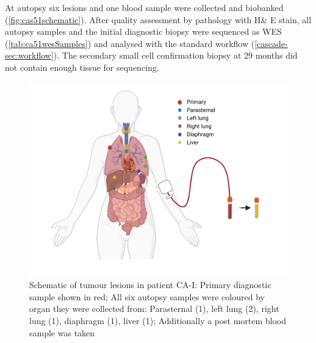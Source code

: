 At autopsy six lesions and one blood sample were collected and biobanked (\autoref{fig:cas51schematic}). After quality assessment by pathology with H\& E stain, all autopsy samples and the initial diagnostic biopsy were sequenced as WES (\autoref{tab:ca51wesSamples}) and analysed with the standard workflow (\autoref{cascade-sec:workflow}). The secondary small cell confirmation biopsy at 29 months did not contain enough tissue for sequencing.

\begin{figure}[ht]
	\centering
	\includegraphics[width=.99\linewidth]{Figures/CASCADE/CA51/CA-I_schematic_CA51_organColours}
	\caption[Schematic of tumour lesions in patient CA-I]{Schematic of tumour lesions in patient CA-I: Primary diagnostic sample shown in red; All six autopsy samples were coloured by organ they were collected from: Parasternal (1), left lung (2), right lung (1), diaphragm (1), liver (1); Additionally a post mortem blood sample was taken} \label{fig:cas51schematic}
\end{figure}



